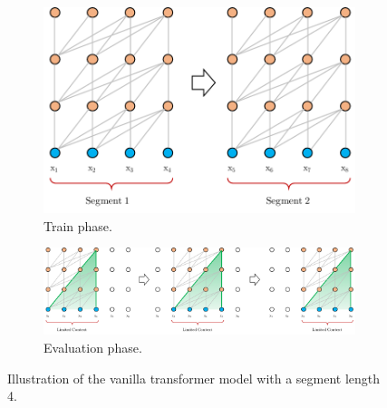 \begin{figure}[!h]
	\begin{subfigure}[b]{0.292\linewidth}
		\includegraphics[width=\textwidth]{images/vanilla-train.pdf}
		\caption{\small Train phase.}
		\label{fig:vanilla-train}
	\end{subfigure}
	\begin{subfigure}[b]{0.69\linewidth}
		\includegraphics[width=\textwidth]{images/vanilla-eval.pdf}
		\caption{\small Evaluation phase.}
		\label{fig:vanilla-eval}
	\end{subfigure}
	\caption{\small Illustration of the vanilla transformer model with a segment length 4. \cite{dai2019transformerxlattentivelanguagemodels}}
	\label{fig:vanilla}
\end{figure}


